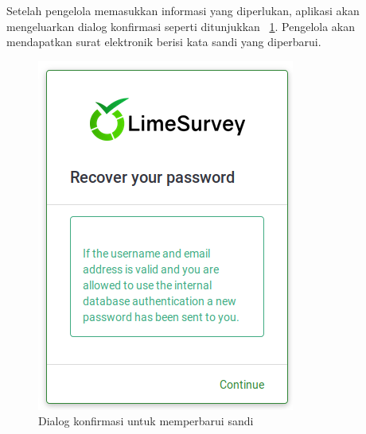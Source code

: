Setelah pengelola memasukkan informasi yang diperlukan, aplikasi akan mengeluarkan dialog konfirmasi seperti ditunjukkan \figurename~\ref{fig:konfirmasiSandi}. Pengelola akan mendapatkan surat elektronik berisi kata sandi yang diperbarui.
\begin{figure}
  \begin{center}
    \includegraphics[scale=.35]{pics/recoverPasswd1.png}
    \caption{Dialog konfirmasi untuk memperbarui sandi}
    \label{fig:konfirmasiSandi}
  \end{center}
\end{figure}
